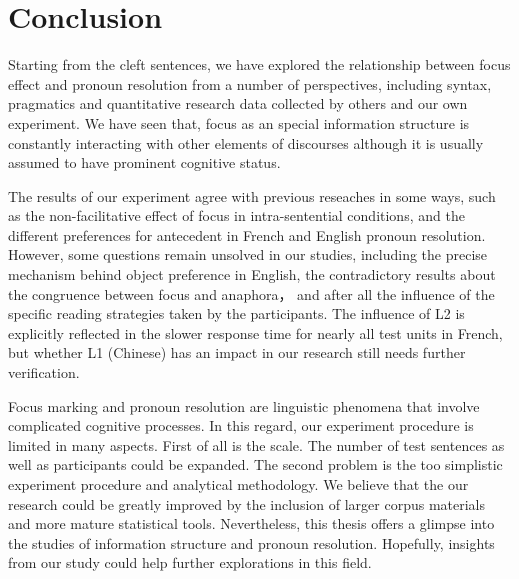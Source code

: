 \chapter{Conclusion}

Starting from the cleft sentences, we have explored the relationship between focus effect and pronoun resolution from a number of perspectives, including syntax, pragmatics and quantitative research data collected by others and our own experiment. We have seen that, focus as an special information structure is constantly interacting with other elements of discourses although it is usually assumed to have prominent cognitive status.

The results of our experiment agree with previous reseaches in some ways, such as the non-facilitative effect of focus in intra-sentential conditions, and the different preferences for antecedent in French and English pronoun resolution. However, some questions remain unsolved in our studies, including the precise mechanism behind object preference in English, the contradictory results about the congruence between focus and anaphora， and after all the influence of the specific reading strategies taken by the participants. The influence of L2 is explicitly reflected in the slower response time for nearly all test units in French, but whether L1 (Chinese) has an impact in our research still needs further verification. 

Focus marking and pronoun resolution are linguistic phenomena that involve complicated cognitive processes. In this regard, our experiment procedure is limited in many aspects. First of all is the scale. The number of test sentences as well as participants could be expanded. The second problem is the too simplistic experiment procedure and analytical methodology. We believe that the our research could be greatly improved by the inclusion of larger corpus materials and more mature statistical tools. Nevertheless, this thesis offers a glimpse into the studies of information structure and pronoun resolution. Hopefully, insights from our study could help further explorations in this field.



